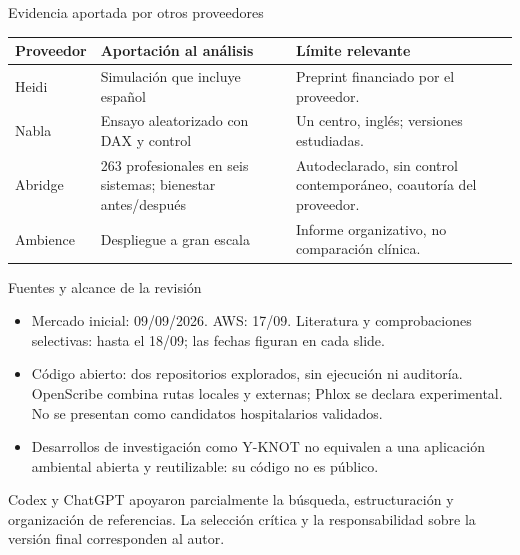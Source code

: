 \documentclass[aspectratio=169,10pt]{beamer}
\begin{document}
\renewcommand{\backupid}{A2}
\begin{frame}[t,noframenumbering]{Evidencia aportada por otros proveedores}
\small
\begin{tabularx}{\textwidth}{L{.16\textwidth}XX}
\toprule
Proveedor & Aportación al análisis & Límite relevante \\
\midrule
Heidi & Simulación que incluye español & Preprint financiado por el proveedor. \\
Nabla & Ensayo aleatorizado con DAX y control & Un centro, inglés; versiones estudiadas. \\
Abridge & 263 profesionales en seis sistemas; bienestar antes/después & Autodeclarado, sin control contemporáneo, coautoría del proveedor. \\
Ambience & Despliegue a gran escala & Informe organizativo, no comparación clínica. \\
\bottomrule
\end{tabularx}
\end{frame}

\renewcommand{\backupid}{A3}
\begin{frame}[t,noframenumbering]{Fuentes y alcance de la revisión}
\small
\begin{itemize}
\item Mercado inicial: 09/09/2026. AWS: 17/09. Literatura y comprobaciones selectivas: hasta el 18/09; las fechas figuran en cada slide.
\item Código abierto: dos repositorios explorados, sin ejecución ni auditoría. OpenScribe combina rutas locales y externas; Phlox se declara experimental. No se presentan como candidatos hospitalarios validados.
\item Desarrollos de investigación como Y-KNOT no equivalen a una aplicación ambiental abierta y reutilizable: su código no es público.
\end{itemize}
\par\vspace{2mm}
\footnotesize Codex y ChatGPT apoyaron parcialmente la búsqueda, estructuración y organización de referencias. La selección crítica y la responsabilidad sobre la versión final corresponden al autor.
\end{frame}
\end{document}
